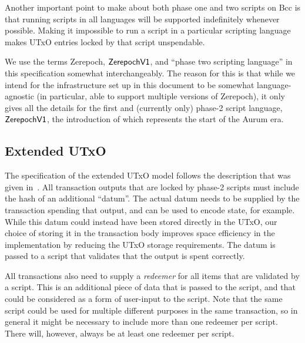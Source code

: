 Another important point to make about both phase one and two scripts on Bcc is that
running scripts in all languages will be supported indefinitely whenever possible.
Making it impossible to run a script in a particular scripting language
makes UTxO entries locked by that script unspendable.

We use the terms Zerepoch, $\mathsf{ZerepochV1}$, and ``phase two scripting language'' in this specification
somewhat interchangeably. The reason for this is that while we intend for the infrastructure
set up in this document to be somewhat language-agnostic (in particular,
able to support multiple versions of Zerepoch), it only gives all the details for
the first and (currently only) phase-2 script language, $\mathsf{ZerepochV1}$,
the introduction of which represents the
start of the Aurum era.


\subsection{Extended UTxO}

The specification of the extended UTxO model follows the description that was given in~\cite{chakravarty2020extended}.
All transaction outputs that are locked by phase-2 scripts must include the hash of an additional ``datum''. The actual datum needs to be supplied by the transaction spending that output, and can be used to encode state, for example.
While this datum could instead have been stored directly in the UTxO, our choice of storing it in the transaction body improves space efficiency in the implementation by reducing the UTxO storage requirements. The datum is passed to a script that validates that the output is spent correctly.

All transactions also need to supply a \emph{redeemer} for all items that are validated by a script. This is an additional piece of data that is passed to the script, and that could be considered as a form of user-input to the script. Note that the same script could be used for multiple different purposes in the same transaction, so in general it might be necessary to include more than one redeemer per script.
There will, however, always be at least one redeemer per script.
